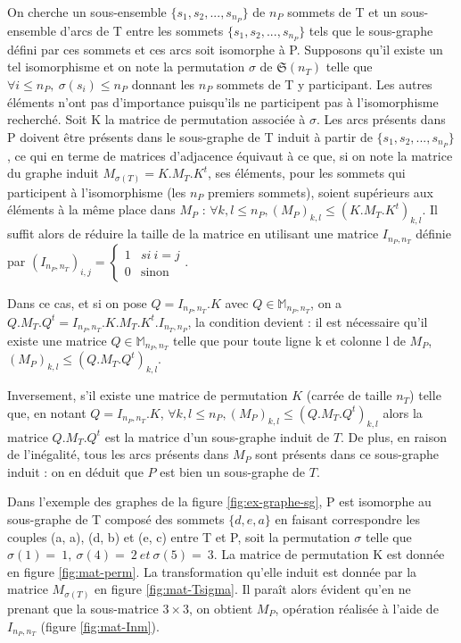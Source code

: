 \begin{pr}
On cherche un sous-ensemble $\{s_1, s_2, ..., s_{n_P}\}$ de $n_P$ sommets de T et un sous-ensemble d'arcs de T entre les sommets $\{s_1, s_2, ..., s_{n_P}\}$ tels que le sous-graphe défini par ces sommets et ces arcs soit isomorphe à P. Supposons qu'il existe un tel isomorphisme et on note la permutation $\sigma$ de $\mathfrak{S}(n_T)$ telle que $\forall i \leq n_P,\ \sigma(s_i) \leq n_P$ donnant les $n_P$ sommets de T y participant. Les autres éléments n'ont pas d'importance
puisqu'ils ne participent pas à l'isomorphisme recherché. Soit K la matrice de permutation associée à $\sigma$.
Les arcs présents dans P doivent être présents dans le sous-graphe de T induit à partir de $\{s_1, s_2, ..., s_{n_P}\}$, ce qui en terme de matrices d'adjacence équivaut à ce que, si on note la matrice du graphe induit $M_{\sigma(T)}=K.M_T.K^t$, ses éléments, pour les sommets qui participent à l'isomorphisme (les $n_P$ premiers sommets), soient supérieurs aux éléments à la même place dans $M_P$ : $\forall k,l\leq n_P, (M_P)_{k,l}\leq (K.M_T.K^t)_{k,l}$. Il suffit alors de réduire la taille de la matrice en utilisant une matrice $I_{n_P, n_T}$ définie par
$(I_{n_P, n_T})_{i, j} = \left\{
  \begin{array}{ll}
	  1 & si\ i=j
	\\0 & \mbox{sinon}
  \end{array}
\right.
$.


Dans ce cas, et si on pose $Q=I_{n_P, n_T}.K$ avec $Q\in \mathbb{M}_{n_P, n_T}$, on a $Q.M_T.Q^t=I_{n_P, n_T}.K.M_T.K^t.I_{n_T, n_P}$, la condition devient : il est nécessaire qu'il existe une matrice $Q\in \mathbb{M}_{n_P, n_T}$ telle que pour toute ligne k et colonne l de $M_P$, $(M_P)_{k,l}\leq (Q.M_T.Q^t)_{k,l}$.

Inversement, s'il existe une matrice de permutation $K$ (carrée de taille $n_T$) telle que, en notant $Q=I_{n_P, n_T}.K$, $\forall k,l\leq n_P, (M_P)_{k,l}\leq (Q.M_T.Q^t)_{k,l}$ alors la matrice $Q.M_T.Q^t$ est la matrice d'un sous-graphe induit de $T$. De plus, en raison de l'inégalité, tous les arcs présents dans $M_P$ sont présents dans ce sous-graphe induit : on en déduit que $P$ est bien un sous-graphe de $T$.
\end{pr}

Dans l'exemple des graphes de la figure \ref{fig:ex-graphe-sg}, P est isomorphe au sous-graphe de T composé des sommets $\{d, e, a\}$ en faisant correspondre les couples (a, a), (d, b) et (e, c) entre T et P, soit la
permutation $\sigma$ telle que $\sigma(1)=~1,\ \sigma(4)=~2\ et\ \sigma(5)=~3$. La matrice de permutation K est donnée en figure \ref{fig:mat-perm}.
La transformation qu'elle induit est donnée par la matrice $M_{\sigma(T)}$ en figure \ref{fig:mat-Tsigma}. Il paraît alors évident qu'en ne prenant que la sous-matrice $3\times 3$, on obtient $M_P$, opération
réalisée à l'aide de $I_{n_P, n_T}$ (figure \ref{fig:mat-Inm}).


